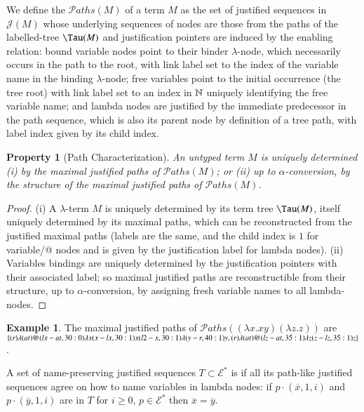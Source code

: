 \documentclass{elsarticle}
\theoremstyle{plain}
\newtheorem{property}[theorem]{Property}
\theoremstyle{definition}
\newtheorem{example}{Example}[section]
\def\nameencoding{\mathcal{E}} %
\newcommand{\ctree}{\Tau} %
\newcommand\pathset{{\mathcal{P}aths}} %
\def\justseqset{\mathcal{J}}
\begin{document}
We define the  $\pathset(M)$ of a term $M$ as the set of justified sequences in $\justseqset(M)$
whose underlying sequences of nodes are those from the paths of the labelled-tree $\ctree(M)$ and justification pointers are induced by the enabling relation:
 bound variable nodes point to their binder $\lambda$-node, which necessarily occurs in the path to the root, with link label set to the index of the variable name in the binding $\lambda$-node;
 free variables point to the initial occurrence (the tree root) with link label  set to an index in $\mathbb{N}$ uniquely identifying the
 free variable name;
 and lambda nodes are justified by the immediate predecessor in the path sequence, which is also its parent node by definition of a tree path, with label index given by its child index.
\begin{property}[Path Characterization]
\label{prop:tree_path_charact}
 An untyped term $M$ is uniquely determined
(i) by the maximal justified paths of $\pathset(M)$;
or (ii) up to $\alpha$-conversion, by the \emph{structure} of the maximal justified paths of $\pathset(M)$.
\end{property}
\begin{proof}
(i) A $\lambda$-term $M$ is uniquely determined by its term tree $\ctree(M)$, itself uniquely determined by its maximal paths, which can be reconstructed from the justified maximal paths (labels are the same, and the child index is $1$ for variable/@ nodes and is given by the justification label for lambda nodes).
%
(ii) Variables bindings are uniquely determined by the justification pointers with their associated label; so maximal justified paths are  reconstructible from their structure, up to $\alpha$-conversion, by assigning fresh variable names to all lambda-nodes.
\end{proof}

\begin{example}
    The maximal justified paths of
  $\pathset((\lambda x.x y) (\lambda z.z))$
  are
  $\{
  \Pstr{ (r){\lambda} (at){@} (lx-at,30:0){\lambda x} (x-lx,30:1){x} (l2-x,30:1){\lambda} (y-r,40:1){y} },
  \Pstr{ (r){\lambda} (at){@} (lz-at,35:1){\lambda z} (z-lz,35:1){z}}
  \}$.
\end{example}

A set of name-preserving justified sequences $T\subset \nameencoding^*$ is  if all its path-like justified sequences agree on how to name variables in lambda nodes: if $p \cdot (\overline{x}, 1, i)$ and $p \cdot (\overline{y}, 1, i)$ are in $T$ for $i\geq 0$, $p\in \nameencoding^*$ then $\overline{x} = \overline{y}$.
\end{document}
